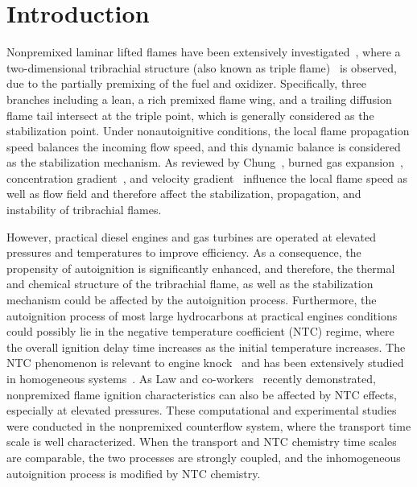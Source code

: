 \documentclass{wssci}
\begin{document}

\section{Introduction}

Nonpremixed laminar lifted flames have been extensively investigated~\cite{chung07}, where a two-dimensional tribrachial structure (also known as triple flame)~\cite{buckmaster02} is observed, due to the partially premixing of the fuel and oxidizer.  Specifically, three branches including a lean, a rich premixed flame wing, and a trailing diffusion flame tail intersect at the triple point, which is generally considered as the stabilization point.  Under nonautoignitive conditions, the local flame propagation speed balances the incoming flow speed, and this dynamic balance is considered as the stabilization mechanism.  As reviewed by Chung~\cite{chung07}, burned gas expansion~\cite{ruetsch95,lee97,plessing98,kioni99}, concentration gradient~\cite{dold89,hartley91,ghosal00}, and velocity gradient~\cite{kim07} influence the local flame speed as well as flow field and therefore affect the stabilization, propagation, and instability of tribrachial flames.

However, practical diesel engines and gas turbines are operated at elevated pressures and temperatures to improve efficiency.  As a consequence, the propensity of autoignition is significantly enhanced, and therefore, the thermal and chemical structure of the tribrachial flame, as well as the stabilization mechanism could be affected by the autoignition process.  Furthermore, the autoignition process of most large hydrocarbons at practical engines conditions could possibly lie in the negative temperature coefficient (NTC) regime, where the overall ignition delay time increases as the initial temperature increases.  The NTC phenomenon is relevant to engine knock~\cite{battin-leclerc08} and has been extensively studied in homogeneous systems~\cite{zador11}.  As Law and co-workers~\cite{law12,zhao13,deng14} recently demonstrated, nonpremixed flame ignition characteristics can also be affected by NTC effects, especially at elevated pressures.  These computational and experimental studies were conducted in the nonpremixed counterflow system, where the transport time scale is well characterized.  When the transport and NTC chemistry time scales are comparable, the two processes are strongly coupled, and the inhomogeneous autoignition process is modified by NTC chemistry.
\end{document}
